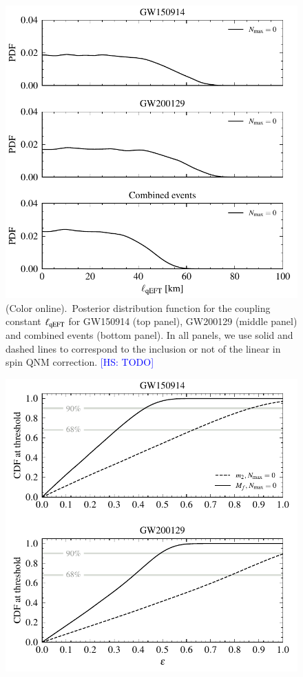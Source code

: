 \documentclass[twocolumn,
               prd,
               aps,
               superscriptaddress,
               tightenlines,
               nofootinbib,
               eqsecnum,
               amsfonts,
               amsmath,
               longbibliography]{revtex4-1}
\newcommand{\hs}[1]{{\textcolor{blue}{{[HS: #1]}} }}
\begin{document}
\begin{figure}[t]
\includegraphics[width=\columnwidth]{figs/qeft_posteriors_combined.pdf}
\caption{(Color online).~Posterior distribution function for the coupling constant $\ell_{\rm qEFT}$ for
GW150914 (top panel), GW200129 (middle panel) and combined events (bottom panel).
%
In all panels, we use solid and dashed lines to correspond to the inclusion or not of the linear
in spin QNM correction.
%
\hs{TODO}
}
\label{fig:qEFT_exec_sum}
\end{figure}

\begin{figure}[t]
\includegraphics[width=\columnwidth]{figs/qeft_cdf_varying_threshold.pdf}
\caption{
}
\label{fig:qEFT_cdf}
\end{figure}
\end{document}
